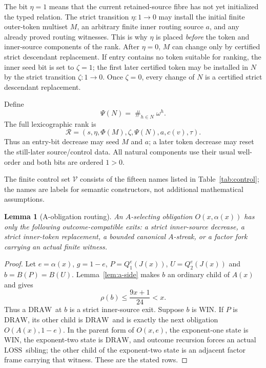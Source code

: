 \documentclass[11pt]{article}
\newtheorem{lemma}[theorem]{Lemma}
\newcommand{\WIN}{\ensuremath{\mathrm{WIN}}}
\newcommand{\LOSS}{\ensuremath{\mathrm{LOSS}}}
\newcommand{\DRAW}{\ensuremath{\mathrm{DRAW}}}
\begin{document}
The bit $\eta=1$ means that the current retained-source fibre has not yet
initialized the typed relation. The strict transition $\eta:1\to0$ may
install the initial finite outer-token multiset $M$, an arbitrary finite inner
routing source $a$, and any already proved routing witnesses. This is why
$\eta$ is placed \emph{before} the token and inner-source components of the
rank. After $\eta=0$, $M$ can change only by certified strict descendant
replacement. If entry contains no token suitable for ranking, the inner
seed bit is set to $\zeta=1$; the first later certified token may be installed
in $N$ by the strict transition $\zeta:1\to0$. Once $\zeta=0$, every change of
$N$ is a certified strict descendant replacement.

Define
\[
  \Psi(N)=\mathop{\#}_{h\in N}\omega^h.
\]
The full lexicographic rank is
\begin{equation}\label{eq:full-rank}
  \mathcal R=(s,\eta,\Phi(M),\zeta,\Psi(N),a,c(v),\tau).
\end{equation}
Thus an entry-bit decrease may seed $M$ and $a$; a later token decrease may
reset the still-later source/control data. All natural components use their
usual well-order and both bits are ordered $1>0$.

The finite control set $\mathcal V$ consists of the fifteen names listed in Table~\ref{tab:control}; the names are labels for semantic constructors, not additional mathematical assumptions.

\begin{lemma}[A-obligation routing]\label{lem:a-routing}
An $A$-selecting obligation $O(x,\alpha(x))$ has only the following
outcome-compatible exits: a strict inner-source decrease, a strict inner-token
replacement, a bounded canonical $A$-streak, or a factor fork carrying an
actual finite witness.
\end{lemma}

\begin{proof}
Let $e=\alpha(x)$, $g=1-e$, $P=Q_1^e(J(x))$, $U=Q_2^e(J(x))$ and
$b=B(P)=B(U)$. Lemma~\ref{lem:a-side} makes $b$ an ordinary child of $A(x)$ and gives
\[
 \rho(b)\le\frac{9x+1}{24}<x.
\]
Thus a \DRAW\ at $b$ is a strict inner-source exit. Suppose $b$ is \WIN. If
$P$ is \DRAW, its other child is \DRAW\ and is exactly the next obligation
$O(A(x),1-e)$. In the parent form of $O(x,e)$, the exponent-one state is
\WIN, the exponent-two state is \DRAW, and outcome recursion forces an
actual \LOSS\ sibling; the other child of the exponent-two state is an
adjacent factor frame carrying that witness. These are the stated rows.
\end{proof}
\end{document}
